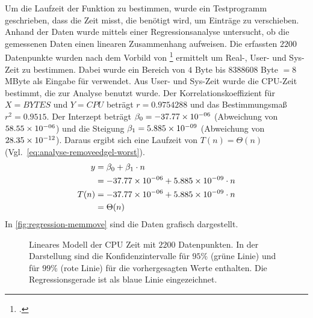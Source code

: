 Um die Laufzeit der Funktion  zu bestimmen, wurde ein Testprogramm geschrieben, dass die Zeit misst,
\label{sub:datenstruktur-edgels-memmove}
 die benötigt wird, um Einträge zu verschieben. Anhand der Daten wurde mittels einer Regressionsanalyse untersucht, ob
 die gemessenen Daten einen linearen Zusammenhang aufweisen. Die erfassten $2200$ Datenpunkte wurden nach dem Vorbild
 von \footcite{time-1} ermittelt um Real-, User- und Sys-Zeit zu bestimmen. Dabei wurde ein Bereich von
 $4$ Byte bis $8388608$ Byte $= 8$ MByte als Eingabe für  verwendet. Aus User- und Sys-Zeit wurde
 die CPU-Zeit bestimmt, die zur Analyse benutzt wurde. Der Korrelationskoeffizient für $X = \mathit{BYTES}$ und
 $Y = \mathit{CPU}$ beträgt $r = 0.9754288$ und das Bestimmungsmaß $r^2 = 0.9515$. Der Interzept beträgt
 $\beta_0 = -37.77\times 10^{-06}$ (Abweichung von $58.55\times 10^{-06}$) und die Steigung $\beta_1 = 5.885\times 10^{-09}$
 (Abweichung von $28.35\times 10^{-12}$). Daraus ergibt sich eine Laufzeit von $T(n) =\Theta(n)$
 (Vgl.~\autoref{eq:analyse-removeedgel-worst}).
\begin{equation}
	\label{eq:analyse-removeedgel-worst}
	\begin{split}
		y& = \beta_0 + \beta_1 \cdot n\\
		 & = -37.77\times 10^{-06} + 5.885\times 10^{-09} \cdot n\\
		T(n)& = -37.77\times 10^{-06} + 5.885\times 10^{-09} \cdot n\\
		 & = \Theta(n)
	\end{split}
\end{equation}
In \autoref{fig:regression-memmove} sind die Daten grafisch dargestellt.
\begin{figure}[!ht]
	\centering
	
	\caption{Lineares Modell der CPU Zeit mit $2200$ Datenpunkten. In der Darstellung sind die Konfidenzintervalle für
	 $95\%$ (grüne Linie) und für $99\%$ (rote Linie) für die vorhergesagten Werte enthalten. Die Regressionsgerade ist
	 als blaue Linie eingezeichnet.}
	\label{fig:regression-memmove}
\end{figure}

